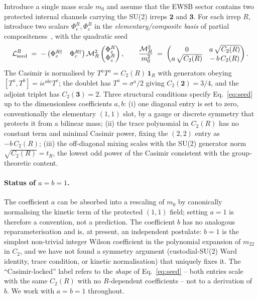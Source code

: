 \documentclass[11pt,a4paper]{article}
\newcommand{\md}{\mathbf{2}}
\newcommand{\mt}{\mathbf{3}}
\newcommand{\Cas}{C_2}
\begin{document}
Introduce a single mass scale $m_0$ and assume that the EWSB sector
contains two protected internal channels carrying the SU(2) irreps $\md$
and $\mt$. For each irrep $R$, introduce two scalars $\Phi^R_e, \Phi^R_c$
in the \emph{elementary/composite basis} of partial
compositeness~\cite{Caracciolo2012}, with the quadratic seed
\begin{equation}
  \mathcal L^R_{\rm seed} \;=\;
  - \begin{pmatrix} \Phi^{R\dagger}_e & \Phi^{R\dagger}_c \end{pmatrix}
  \mathcal M_R^2
  \begin{pmatrix} \Phi^{R}_e \\ \Phi^{R}_c \end{pmatrix},
  \qquad
  \frac{\mathcal M_R^2}{m_0^2}
  \;=\;
  \begin{pmatrix}
    0 & a\,\sqrt{\Cas(R)} \\
    a\,\sqrt{\Cas(R)} & -\,b\,\Cas(R)
  \end{pmatrix}.
\label{eq:seed}
\end{equation}
The Casimir is normalised by $T^a T^a = \Cas(R)\,\mathbf{1}_R$ with
generators obeying $[T^a, T^b] = i\epsilon^{abc} T^c$; the doublet has
$T^a = \sigma^a/2$ giving $\Cas(\md) = 3/4$, and the adjoint triplet has
$\Cas(\mt) = 2$. Three structural conditions specify
Eq.~\eqref{eq:seed} up to the dimensionless coefficients $a, b$:
(i) one diagonal entry is set to zero, conventionally the elementary
$(1,1)$ slot, by a gauge or discrete symmetry that protects it from a
bilinear mass; (ii) the trace polynomial in $\Cas(R)$ has no constant
term and minimal Casimir power, fixing the $(2,2)$ entry as $-b\,\Cas(R)$;
(iii) the off-diagonal mixing scales with the SU(2) generator norm
$\sqrt{\Cas(R)} = t_R$, the lowest odd power of the Casimir consistent
with the group-theoretic content.

\paragraph{Status of $a = b = 1$.} The coefficient $a$ can be absorbed
into a rescaling of $m_0$ by canonically normalising the kinetic term of
the protected $(1,1)$ field; setting $a = 1$ is therefore a convention,
not a prediction. The coefficient $b$ has no analogous reparameterisation
and is, at present, an independent postulate: $b = 1$ is the simplest
non-trivial integer Wilson coefficient in the polynomial expansion of
$m_{22}$ in $\Cas$, and we have not found a symmetry argument
(custodial-SU(2) Ward identity, trace condition, or kinetic
normalisation) that uniquely fixes it. The ``Casimir-locked'' label
refers to the \emph{shape} of Eq.~\eqref{eq:seed} -- both entries scale
with the same $\Cas(R)$ with no $R$-dependent coefficients --
not to a derivation of $b$. We work with $a = b = 1$ throughout.
\end{document}
